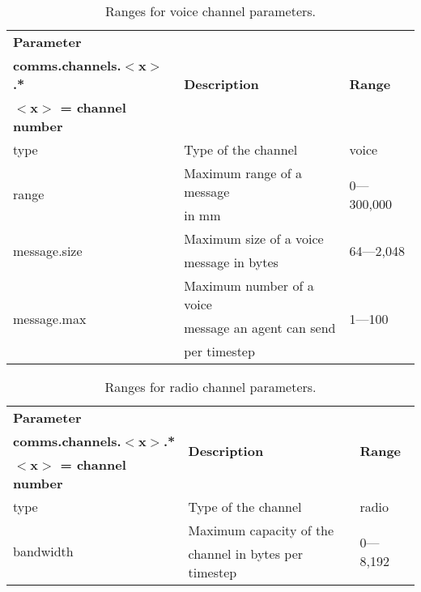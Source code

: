 \documentclass{article}
\begin{document}
\begin{table}[htb]
\caption{Ranges for voice channel parameters.}
\label{tab:5}
\centering
\begin{tabular}{lll}
  \hline
  \textbf{Parameter}                & \multirow{3}{*}{\textbf{Description}} &
  \multirow{3}{*}{\textbf{Range}}\\
  \textbf{comms.channels.$<$x$>$.*} &                                       & \\
  \textbf{$<$x$>$ = channel number} &                                       & \\
  \hline
  type                              & Type of the channel                   &
  voice\\
  \hline
  \multirow{2}{*}{range}            & Maximum range of a message            & 
  \multirow{2}{*}{0---300,000}\\
                                    & in mm                                 & \\
  \hline
  \multirow{2}{*}{message.size}     & Maximum size of a voice               & 
  \multirow{2}{*}{64---2,048}\\
                                    & message in bytes                      & \\
  \hline
  \multirow{3}{*}{message.max}      & Maximum number of a voice             & 
  \multirow{3}{*}{1---100}\\
                                    & message an agent can send             & \\
                                    & per timestep                          & \\
  \hline
\end{tabular}
\end{table}

\begin{table}[htb]
\caption{Ranges for radio channel parameters.}
\label{tab:6}
\centering
\begin{tabular}{lll}
  \hline
  \textbf{Parameter}                & \multirow{3}{*}{\textbf{Description}} &
  \multirow{3}{*}{\textbf{Range}}\\
  \textbf{comms.channels.$<$x$>$.*} &                                       & \\
  \textbf{$<$x$>$ = channel number} &                                       & \\
  \hline
  type                              & Type of the channel                   &
  radio\\
  \hline
  \multirow{2}{*}{bandwidth}        & Maximum capacity of the               & 
  \multirow{2}{*}{0---8,192}\\
                                    & channel in bytes per timestep         & \\
  \hline
\end{tabular}
\end{table}
\end{document}
